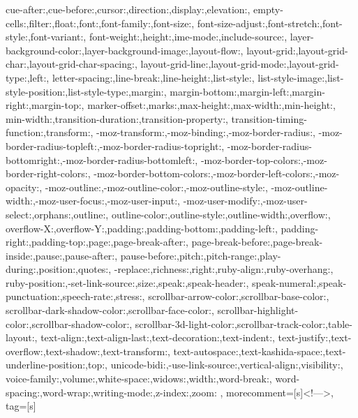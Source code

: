 {{    cue-after:,cue-before:,cursor:,direction:,display:,elevation:,
    empty-cells:,filter:,float:,font:,font-family:,font-size:,
    font-size-adjust:,font-stretch:,font-style:,font-variant:,
    font-weight:,height:,ime-mode:,include-source:,
    layer-background-color:,layer-background-image:,layout-flow:,
    layout-grid:,layout-grid-char:,layout-grid-char-spacing:,
    layout-grid-line:,layout-grid-mode:,layout-grid-type:,left:,
    letter-spacing:,line-break:,line-height:,list-style:,
    list-style-image:,list-style-position:,list-style-type:,margin:,
    margin-bottom:,margin-left:,margin-right:,margin-top:,
    marker-offset:,marks:,max-height:,max-width:,min-height:,
    min-width:,transition-duration:,transition-property:,
    transition-timing-function:,transform:,
    -moz-transform:,-moz-binding:,-moz-border-radius:,
    -moz-border-radius-topleft:,-moz-border-radius-topright:,
    -moz-border-radius-bottomright:,-moz-border-radius-bottomleft:,
    -moz-border-top-colors:,-moz-border-right-colors:,
    -moz-border-bottom-colors:,-moz-border-left-colors:,-moz-opacity:,
    -moz-outline:,-moz-outline-color:,-moz-outline-style:,
    -moz-outline-width:,-moz-user-focus:,-moz-user-input:,
    -moz-user-modify:,-moz-user-select:,orphans:,outline:,
    outline-color:,outline-style:,outline-width:,overflow:,
    overflow-X:,overflow-Y:,padding:,padding-bottom:,padding-left:,
    padding-right:,padding-top:,page:,page-break-after:,
    page-break-before:,page-break-inside:,pause:,pause-after:,
    pause-before:,pitch:,pitch-range:,play-during:,position:,quotes:,
    -replace:,richness:,right:,ruby-align:,ruby-overhang:,
    ruby-position:,-set-link-source:,size:,speak:,speak-header:,
    speak-numeral:,speak-punctuation:,speech-rate:,stress:,
    scrollbar-arrow-color:,scrollbar-base-color:,
    scrollbar-dark-shadow-color:,scrollbar-face-color:,
    scrollbar-highlight-color:,scrollbar-shadow-color:,
    scrollbar-3d-light-color:,scrollbar-track-color:,table-layout:,
    text-align:,text-align-last:,text-decoration:,text-indent:,
    text-justify:,text-overflow:,text-shadow:,text-transform:,
    text-autospace:,text-kashida-space:,text-underline-position:,top:,
    unicode-bidi:,-use-link-source:,vertical-align:,visibility:,
    voice-family:,volume:,white-space:,widows:,width:,word-break:,
    word-spacing:,word-wrap:,writing-mode:,z-index:,zoom:
    },  
    morecomment=[s]{<!--}{-->},
    tag=[s]
}

